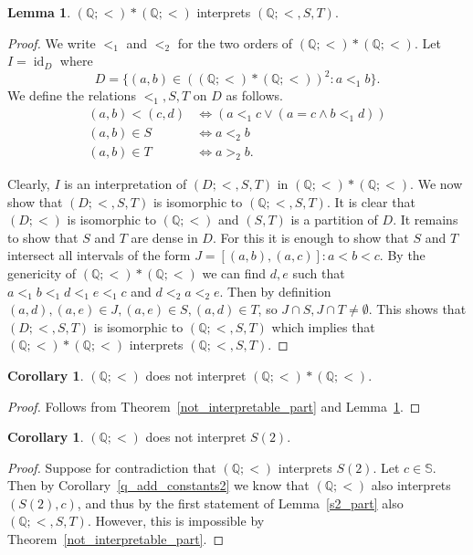 \documentclass{amsart}
\theoremstyle{definition}
\newtheorem{lemma}[theorem]{Lemma}
\newtheorem{corollary}[theorem]{Corollary}
\theoremstyle{remark}
\numberwithin{equation}{section}
\newcommand{\id}{\operatorname{id}}
\newcommand{\cc}{\mathbb{S}}
\begin{document}
\begin{lemma}\label{prem_inter_part}
	$(\mathbb{Q};<)*(\mathbb{Q};<)$ interprets $(\mathbb{Q};<,S,T)$.
\end{lemma} 

\begin{proof}
	We write $<_1$ and $<_2$ for the two orders of $(\mathbb{Q};<)*(\mathbb{Q};<)$. Let $I=\id_D$ where $$D=\{(a,b)\in ((\mathbb{Q};<)*(\mathbb{Q};<))^2: a<_1b\}.$$ We define the relations $<_1,S,T$ on $D$ as follows.
\begin{align*}
	(a,b)<(c,d)&\Leftrightarrow (a <_1 c\vee (a=c\wedge b <_1 d))\\
	(a,b)\in S&\Leftrightarrow a<_2b\\
	(a,b)\in T&\Leftrightarrow a>_2b.
\end{align*}

	Clearly, $I$ is an interpretation of $(D;<,S,T)$ in $(\mathbb{Q};<)*(\mathbb{Q};<)$. We now show that $(D;<,S,T)$ is isomorphic to $(\mathbb{Q};<,S,T)$. It is clear that $(D;<)$ is isomorphic to $(\mathbb{Q};<)$ and $(S,T)$ is a partition of $D$. It remains to show that $S$ and $T$ are dense in $D$. For this it is enough to show that $S$ and $T$ intersect all intervals of the form $J= [(a,b),(a,c)]: a<b<c$. By the genericity of $(\mathbb{Q};<)*(\mathbb{Q};<)$ we can find $d,e$ such that $a<_1b<_1d<_1e<_1c$ and $d<_2{a}<_2e$. Then by definition $(a,d),(a,e)\in J, (a,e)\in S, (a,d)\in T$, so $J\cap S,J\cap T\neq\emptyset$. This shows that $(D;<,S,T)$ is isomorphic to $(\mathbb{Q};<,S,T)$ which implies that $(\mathbb{Q};<)*(\mathbb{Q};<)$ interprets $(\mathbb{Q};<,S,T)$.
\end{proof}

\begin{corollary}\label{not_interpretable_perm}
	$(\mathbb{Q};<)$ does not interpret $(\mathbb{Q};<)*(\mathbb{Q};<)$.
\end{corollary}

\begin{proof}
	Follows from Theorem~\ref{not_interpretable_part} and Lemma~\ref{prem_inter_part}.
\end{proof}

\begin{corollary}\label{not_interpretable_s2}
	$(\mathbb{Q};<)$ does not interpret $S(2)$.
\end{corollary}

\begin{proof}
	Suppose for contradiction that $(\mathbb{Q};<)$ interprets $S(2)$. Let $c\in \cc$. Then by Corollary~\ref{q_add_constants2} we know that $(\mathbb{Q};<)$ also interprets $(S(2),c)$, and thus by the first statement of Lemma~\ref{s2_part} also $(\mathbb{Q};<,S,T)$. However, this is impossible by Theorem~\ref{not_interpretable_part}.
\end{proof}
\end{document}
